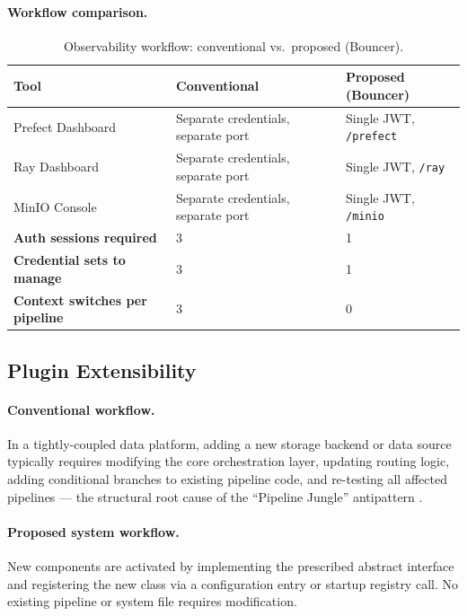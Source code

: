\documentclass[12pt, a4paper]{report}
\begin{document}
\paragraph{Workflow comparison.}

\begin{table}[H]
  \centering
  \caption{Observability workflow: conventional vs.\ proposed (Bouncer).}
  \label{tab:bouncer_workflow}
  \begin{tabularx}{\textwidth}{lXX}
    \toprule
    \textbf{Tool} &
    \textbf{Conventional} &
    \textbf{Proposed (Bouncer)} \\
    \midrule
    Prefect Dashboard &
    Separate credentials, separate port & Single JWT, \texttt{/prefect} \\
    Ray Dashboard &
    Separate credentials, separate port & Single JWT, \texttt{/ray} \\
    MinIO Console &
    Separate credentials, separate port & Single JWT, \texttt{/minio} \\
    \midrule
    \textbf{Auth sessions required}          & 3 & 1 \\
    \textbf{Credential sets to manage}       & 3 & 1 \\
    \textbf{Context switches per pipeline}   & 3 & 0 \\
    \bottomrule
  \end{tabularx}
\end{table}

\subsection{Plugin Extensibility}
\label{ssec:extensibility_eval}

\paragraph{Conventional workflow.}
In a tightly-coupled data platform, adding a new storage backend or data source
typically requires modifying the core orchestration layer, updating routing logic,
adding conditional branches to existing pipeline code, and re-testing all affected
pipelines — the structural root cause of the ``Pipeline Jungle'' antipattern
\citep{sculley2015hidden}.

\paragraph{Proposed system workflow.}
New components are activated by implementing the prescribed abstract interface and
registering the new class via a configuration entry or startup registry call.
No existing pipeline or system file requires modification.
\end{document}
